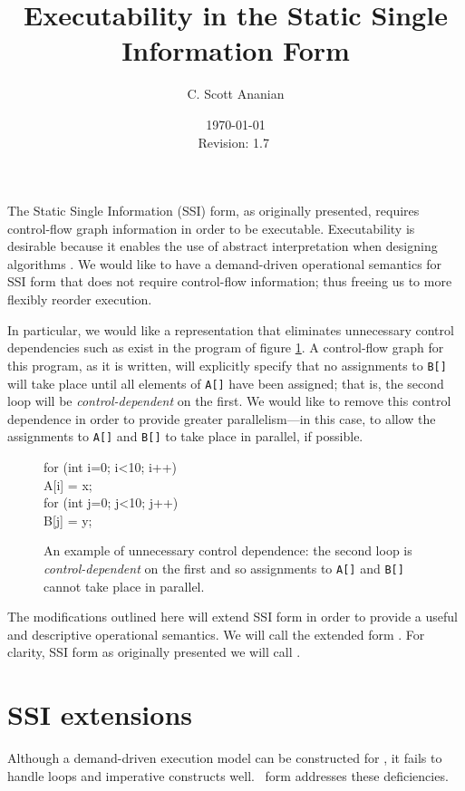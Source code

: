 \documentclass[12pt,notitlepage,twoside]{article}
\title{Executability in the Static Single Information Form}
\author{C. Scott Ananian}
\date{\today \\ $ $Revision: 1.7 $ $}
\begin{document}


\maketitle

The Static Single Information (SSI) form, as originally presented,
requires control-flow graph information in order to be executable.
Executability is desirable because it enables the use of abstract
interpretation when designing algorithms \cite{pingali90:dfg}.  We
would like to have a demand-driven operational semantics for SSI form
that does not require control-flow information; thus freeing us to
more flexibly reorder execution.

In particular, we would like a representation that eliminates
unnecessary control dependencies such as exist in the program of
figure \ref{fig:ctrldep}.  A control-flow graph for this program, as
it is written, will explicitly specify that no assignments to
\texttt{B[]} will take place until all elements of \texttt{A[]} have
been assigned; that is, the second loop will be
\emph{control-dependent} on the first.  We would like to remove this
control dependence in order to provide greater parallelism---in this
case, to allow the assignments to \texttt{A[]} and \texttt{B[]} to
take place in parallel, if possible.

\begin{figure}[t]
\begin{samplecode}
for (int i=0; i<10; i++)\\
\>A[i] = x;\\
for (int j=0; j<10; j++)\\
\>B[j] = y;\\
\end{samplecode}
\caption{An example of unnecessary control dependence: the second loop
is \emph{control-dependent} on the first and so assignments to
\texttt{A[]} and \texttt{B[]} cannot take place in parallel.}
\label{fig:ctrldep}
\end{figure}

The modifications outlined here will extend SSI form in order to
provide a useful and descriptive operational semantics.  We will call
the extended form \ssiplus.  For clarity, SSI form as originally
presented we will call \ssizero.

\section{SSI extensions}
Although a demand-driven execution model can be constructed for
\ssizero,  it fails to handle loops and imperative
constructs well. \ssiplus\ form addresses these deficiencies.
\end{document}
